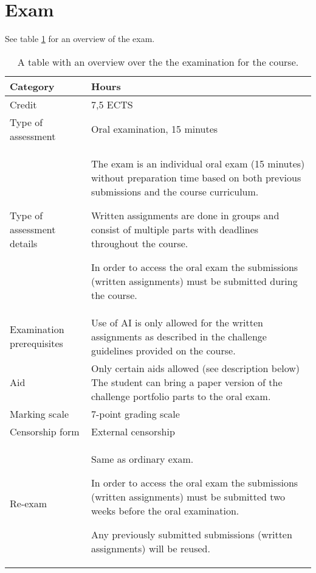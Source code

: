\section*{Exam}
See table \ref{tab:exam_info} for an overview of the exam.
\begin{table}[h]
    \centering
    \caption{A table with an overview over the the examination for the course.}
    \label{tab:exam_info}
    \begin{tabular}{ p{} | p{} }
        \textbf{Category} & \textbf{Hours} \\ 
        \hline
        Credit & 7,5 ECTS \\ 

        Type of assessment & Oral examination, 15 minutes \\

        Type of assessment details & The exam is an individual oral exam (15 minutes) without preparation time based on both previous submissions and the course curriculum.

        Written assignments are done in groups and consist of multiple
        parts with deadlines throughout the course.
        
        In order to access the oral exam the submissions (written assignments) must be submitted during the course. \\ 

        Examination prerequisites & Use of AI is only allowed for the written assignments as described in the challenge guidelines provided on the course.  \\

        Aid & Only certain aids allowed (see description below)
        The student can bring a paper version of the challenge portfolio parts to the oral exam. \\

        Marking scale & 
        7-point grading scale \\ 

        Censorship form & External censorship \\
        
        Re-exam & Same as ordinary exam.

        In order to access the oral exam the submissions (written assignments) must be submitted two weeks before the oral examination.
        
        Any previously submitted submissions (written assignments) will be reused. \\
    \end{tabular}
\end{table}



\newpage